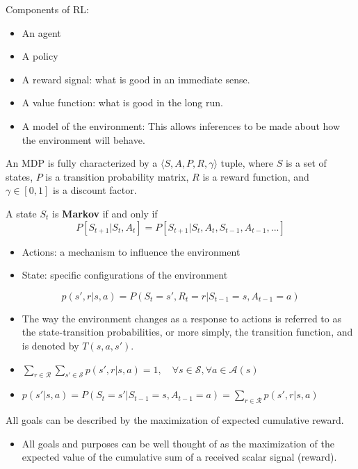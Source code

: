 Components of RL:
\begin{itemize}
	\item An agent
	\item A policy
	\item A reward signal: what is good in an immediate sense.
	\item A value function: what is good in the long run.
	\item A model of the environment: This allows inferences to be made about how the environment will behave.
\end{itemize}
An MDP is fully characterized by a $\langle S,A,P,R,\gamma \rangle$ tuple, where $S$ is a set of states, $P$ is a transition probability matrix, $R$ is a reward function, and $\gamma\in[0,1]$  is a discount factor.

\begin{definition}
	A state $S_t$ is \textbf{Markov} if and only if 
	$$P[S_{t+1}|S_t, A_t] = P[S_{t+1}|S_t, A_t, S_{t-1},A_{t-1},...]$$
\end{definition}
\begin{itemize}
	\item Actions: a mechanism to influence the environment
	\item State: specific configurations of the environment
\end{itemize}

\begin{definition}
	$$p(s',r|s,a) = P(S_t=s',R_t=r|S_{t-1}=s,A_{t-1}=a)$$
\end{definition}
\begin{itemize}
	\item The way the environment changes as a response to actions is referred to as the state-transition probabilities, or more simply, the transition function, and is denoted by $T(s,a,s')$.
	\item $\sum_{r\in \mathcal{R}}\sum_{s'\in \mathcal{S}}p(s',r|s,a) = 1, \quad \forall s \in \mathcal{S}, \forall a\in \mathcal{A}(s)$
	\item $p(s'|s,a)=P(S_t=s'|S_{t-1}=s,A_{t-1}=a)=\sum_{r\in \mathcal{R}}p(s',r|s,a)$
\end{itemize}

\begin{definition}
	All goals can be described by the maximization of expected cumulative reward.
\end{definition}
\begin{itemize}
	\item All goals and purposes can be well thought of as the maximization of the expected value of the cumulative sum of a received scalar signal (\ie reward).
\end{itemize}

